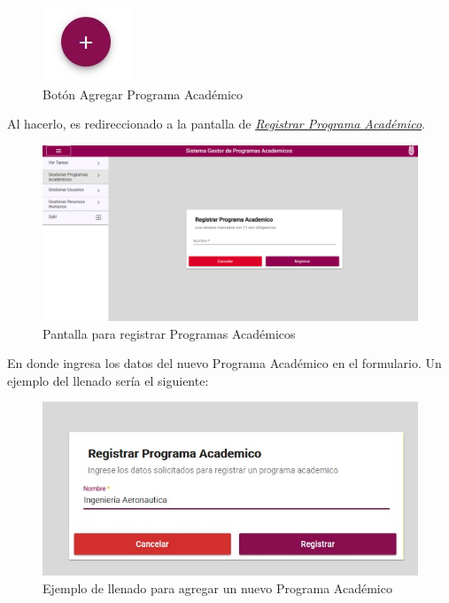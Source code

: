             \begin{figure}[H]
                \centering
                \hypertarget{add}{\includegraphics[width=0.7\linewidth]{images/SP3/BtnAgregar}}
                \caption{Botón Agregar Programa Académico}
                \label{add}
            \end{figure}

            Al hacerlo, es redireccionado a la pantalla de \hyperlink{registrarpa}{\textit{Registrar Programa Académico}}.

        \begin{figure}[H]
            \centering
            \hypertarget{registrarpa}{\includegraphics[width=0.7\linewidth]{images/SP3/RegistrarPA}}
            \caption{Pantalla para registrar Programas Académicos}
            \label{registrarpa}
        \end{figure}

        En donde ingresa los datos del nuevo Programa Académico en el formulario. Un ejemplo del llenado sería el siguiente:

        \begin{figure}[H]
            \centering
            \hypertarget{ejreg}{\includegraphics[width=0.7\linewidth]{images/SP3/Llenado}}
            \caption{Ejemplo de llenado para agregar un nuevo Programa Académico}
            \label{ejreg}
        \end{figure}

